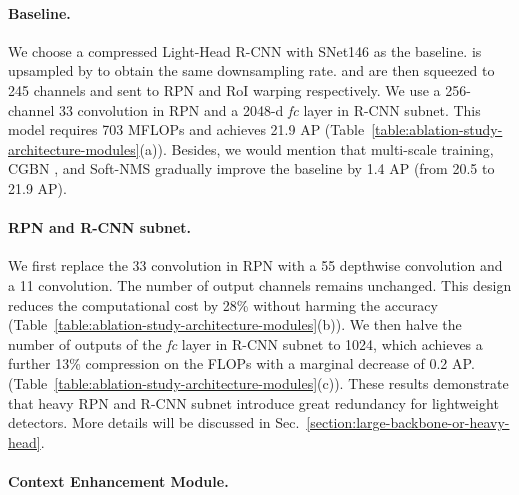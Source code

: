\paragraph{Baseline.}

We choose a compressed Light-Head R-CNN \cite{li2017light} with SNet146 as the baseline.
 is upsampled by  to obtain the same downsampling rate.
 and  are then squeezed to 245 channels and sent to RPN and RoI warping respectively.
We use a 256-channel 33 convolution in RPN and a 2048-d \emph{fc} layer in R-CNN subnet.
This model requires 703 MFLOPs and achieves 21.9 AP (Table~\ref{table:ablation-study-architecture-modules}(a)).
Besides, we would mention that multi-scale training, CGBN \cite{peng2018megdet}, and Soft-NMS \cite{bodla2017soft} gradually improve the baseline by 1.4 AP (from 20.5 to 21.9 AP).

\vspace{-12pt}
\paragraph{RPN and R-CNN subnet.}

We first replace the 33 convolution in RPN with a 55 depthwise convolution and a 11 convolution.
The number of output channels remains unchanged.
This design reduces the computational cost by 28\% without harming the accuracy (Table~\ref{table:ablation-study-architecture-modules}(b)).
We then halve the number of outputs of the \emph{fc} layer in R-CNN subnet to 1024, which achieves a further 13\% compression on the FLOPs with a marginal decrease of 0.2 AP. (Table~\ref{table:ablation-study-architecture-modules}(c)).
These results demonstrate that heavy RPN and R-CNN subnet introduce great redundancy for lightweight detectors.
More details will be discussed in Sec.~\ref{section:large-backbone-or-heavy-head}.

\vspace{-12pt}
\paragraph{Context Enhancement Module.}

